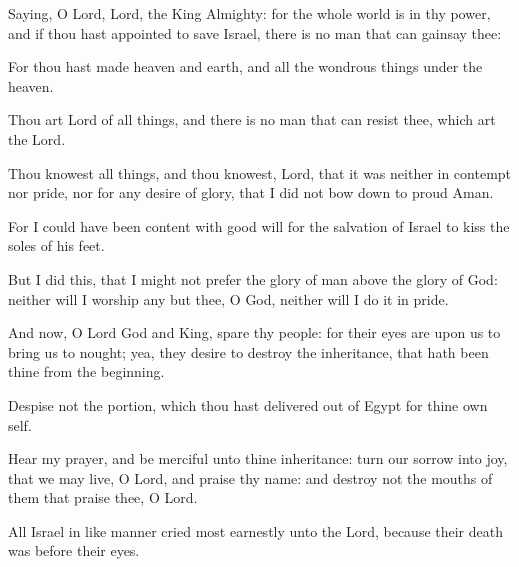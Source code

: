 {\par }{\PP {}Saying, O Lord, Lord, the King Almighty: for the whole world is in thy power, and if thou hast appointed to save Israel, there is no man that can gainsay thee:
\par }{\PP {}For thou hast made heaven and earth, and all the wondrous things under the heaven.
\par }{\PP {}Thou art Lord of all things, and there is no man that can resist thee, which art the Lord.
\par }{\PP {}Thou knowest all things, and thou knowest, Lord, that it was neither in contempt nor pride, nor for any desire of glory, that I did not bow down to proud Aman.
\par }{\PP {}For I could have been content with good will for the salvation of Israel to kiss the soles of his feet.
\par }{\PP {}But I did this, that I might not prefer the glory of man above the glory of God: neither will I worship any but thee, O God, neither will I do it in pride.
\par }{\PP {}And now, O Lord God and King, spare thy people: for their eyes are upon us to bring us to nought; yea, they desire to destroy the inheritance, that hath been thine from the beginning.
\par }{\PP {}Despise not the portion, which thou hast delivered out of Egypt for thine own self.
\par }{\PP {}Hear my prayer, and be merciful unto thine inheritance: turn our sorrow into joy, that we may live, O Lord, and praise thy name: and destroy not the mouths of them that praise thee, O Lord.
\par }{\PP {}All Israel in like manner cried most earnestly unto the Lord, because their death was before their eyes.

}
